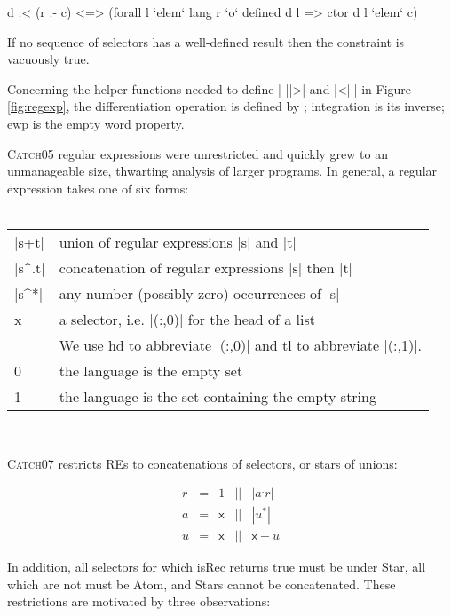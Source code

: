 \documentclass[preprint]{sigplanconf}
\newcommand{\C}[1]{\textsf{#1}}
\newcommand{\catch}{\textsc{Catch}}
\newenvironment{discuss}
    {\noindent\hspace{-1.5mm}\vline\hspace{1mm}\vline\hspace{1mm}\begin{minipage}[h]{\linewidth}}
    {\end{minipage}}
\begin{document}
\begin{code}
d :< (r :- c) <=> (forall l `elem` lang r `o` defined d l => ctor d l `elem` c)
\end{code}

If no sequence of selectors has a well-defined result then the constraint is vacuously true.

Concerning the helper functions needed to define | ||>| and |<||| in Figure \ref{fig:regexp}, the differentiation operation is defined by \citet{conway:regexp}; integration is its inverse; \C{ewp} is the empty word property.

\catch05 regular expressions were unrestricted and quickly grew to an unmanageable size, thwarting analysis of larger programs. In general, a regular expression takes one of six forms:\\ \\
\begin{tabular}{ll}
|s+t|  & union of regular expressions |s| and |t| \\
|s^.t| & concatenation of regular expressions |s| then |t| \\
|s^*|  & any number (possibly zero) occurrences of |s| \\
\C{x}  & a selector, i.e. |(:,0)| for the head of a list \\
       & We use \C{hd} to abbreviate |(:,0)| and \C{tl} to abbreviate |(:,1)|. \\
0      & the language is the empty set \\
1      & the language is the set containing the empty string
\end{tabular} \\

\begin{discuss}
\catch07 restricts REs to concatenations of selectors, or stars of unions:
\end{discuss}

\[\begin{array}{lllll}
r & = & 1     & || & |a^.r| \\
a & = & \C{x} & || & |u^*| \\
u & = & \C{x} & || & \C{x} + u
\end{array}\]

\begin{discuss}
In addition, all selectors for which \C{isRec} returns true must be under \C{Star}, all which are not must be \C{Atom}, and \C{Star}s cannot be concatenated. These restrictions are motivated by three observations:
\end{discuss}
\end{document}
